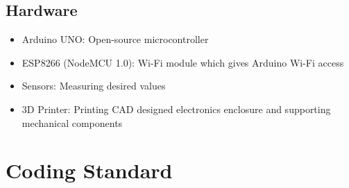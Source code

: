 \documentclass[12pt]{article}
\begin{document}

\subsection{Hardware}
\begin{itemize}
	\item Arduino UNO: Open-source microcontroller 
	\item ESP8266 (NodeMCU 1.0): Wi-Fi module which gives Arduino Wi-Fi access
	\item Sensors: Measuring desired values
	\item 3D Printer: Printing CAD designed electronics enclosure and supporting mechanical components
\end{itemize}



\section{Coding Standard}
\end{document}
